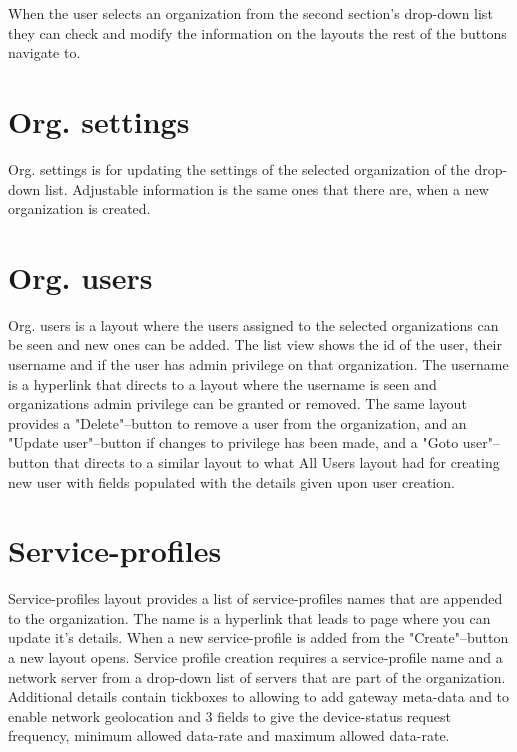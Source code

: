 When the user selects an organization from the second section's drop-down list they can check and modify the information on the layouts the rest of the buttons navigate to.

\section{Org. settings}
Org. settings is for updating the settings of the selected organization of the drop-down list.
Adjustable information is the same ones that there are, when a new organization is created.

\section{Org. users}
Org. users is a layout where the users assigned to the selected organizations can be seen and new ones can be added.
The list view shows the id of the user, their username and if the user has admin privilege on that organization.
The username is a hyperlink that directs to a layout where the username is seen and organizations admin privilege can be granted or removed.
The same layout provides a "Delete"--button to remove a user from the organization, and an "Update user"--button if changes to privilege has been made, and a "Goto user"--button that directs to a similar layout to what All Users layout had for creating new user with fields populated with the details given upon user creation.
\clearpage

\section{Service-profiles}
Service-profiles layout provides a list of service-profiles names that are appended to the organization.
The name is a hyperlink that leads to page where you can update it's details.
When a new service-profile is added from the "Create"--button a new layout opens.
Service profile creation requires a service-profile name and a network server from a drop-down list of servers that are part of the organization.
Additional details contain tickboxes to allowing to add gateway meta-data and to enable network geolocation and 3 fields to give the device-status request frequency, minimum allowed data-rate and maximum allowed data-rate.

